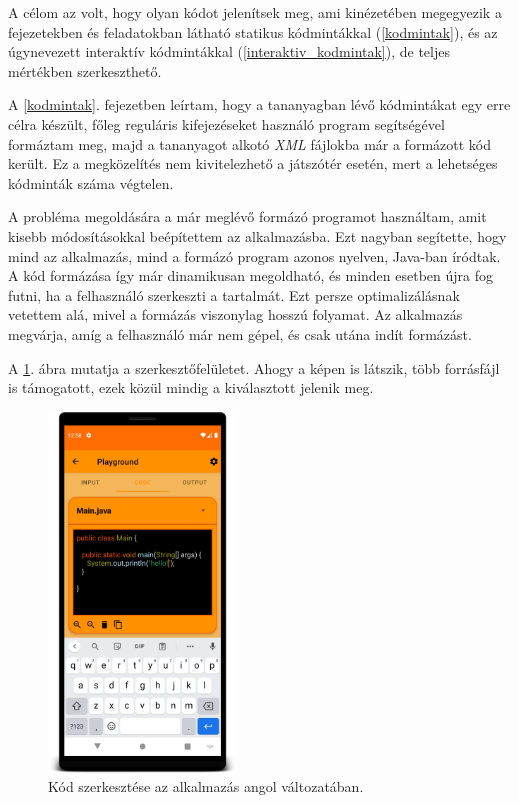 \documentclass[12pt,a4paper]{article}
\newcommand{\xml}{\textit{XML}\xspace}
\begin{document}
	A célom az volt, hogy olyan kódot jelenítsek meg, ami kinézetében megegyezik a fejezetekben és feladatokban látható statikus kódmintákkal (\ref{kodmintak}), és az úgynevezett interaktív kódmintákkal (\ref{interaktiv_kodmintak}), de teljes mértékben szerkeszthető.  
	
	A \ref{kodmintak}. fejezetben leírtam, hogy a tananyagban lévő kódmintákat egy erre célra készült, főleg reguláris kifejezéseket használó program segítségével formáztam meg, majd a tananyagot alkotó \xml fájlokba már a formázott kód került. Ez a megközelítés nem kivitelezhető a játszótér esetén, mert a lehetséges kódminták száma végtelen.
	
	A probléma megoldására a már meglévő formázó programot használtam, amit kisebb módosításokkal beépítettem az alkalmazásba. Ezt nagyban segítette, hogy mind az alkalmazás, mind a formázó program azonos nyelven, Java-ban íródtak. A kód formázása így már dinamikusan megoldható, és minden esetben újra fog futni, ha a felhasználó szerkeszti a tartalmát. Ezt persze optimalizálásnak vetettem alá, mivel a formázás viszonylag hosszú folyamat. Az alkalmazás megvárja, amíg a felhasználó már nem gépel, és csak utána indít formázást.
	
	A \ref{playground_code_figure}. ábra mutatja a szerkesztőfelületet. Ahogy a képen is látszik, több forrásfájl is támogatott, ezek közül mindig a kiválasztott jelenik meg.
	
	\begin{figure}[h!]
		\centering
		\includegraphics[width=5cm]{playground_code}
		\caption{Kód szerkesztése az alkalmazás angol változatában.}
		\label{playground_code_figure}
	\end{figure}
\end{document}
